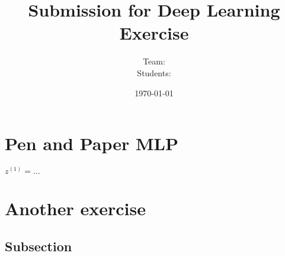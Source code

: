 \documentclass[addpoints]{exam}
\title{Submission for Deep Learning Exercise \assignmentnumber}
\author{Team: \teamname\\Students: \students}
\date{\today}
\begin{document}
    \maketitle


    \section{Pen and Paper MLP}

    $z^{(1)} = \dots$

    \section{Another exercise}
    
    \subsection{Subsection}

\end{document}
